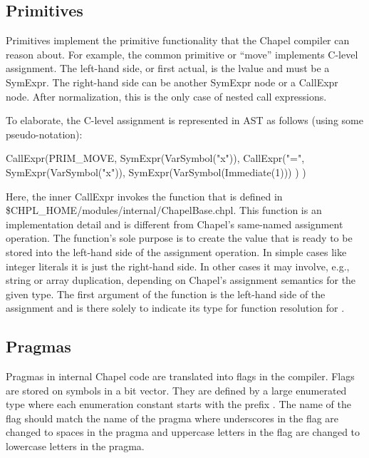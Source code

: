 \documentclass[10pt]{article}
\begin{document}
\subsection{Primitives}
\label{sec:primitives}
\label{sec:moveprimitive}

Primitives implement the primitive functionality that the Chapel
compiler can reason about.  For example, the common primitive
 or ``move'' implements C-level assignment.  The
left-hand side, or first actual, is the lvalue and must be a SymExpr.
The right-hand side can be another SymExpr node or a CallExpr node.
After normalization, this is the only case of nested call expressions.

To elaborate, the C-level assignment  is represented in AST
as follows (using some pseudo-notation):
\begin{clang}
CallExpr(PRIM_MOVE,
         SymExpr(VarSymbol("x")),
         CallExpr("=",
                  SymExpr(VarSymbol("x")),
                  SymExpr(VarSymbol(Immediate(1)))
                  )
         )
\end{clang}

Here, the inner CallExpr invokes the \chpl{=} function that is defined
in \$CHPL\_HOME/modules/internal/ChapelBase.chpl.  This function is an
implementation detail and is different from Chapel's same-named
assignment operation.  The \chpl{=} function's sole purpose is to
create the value that is ready to be stored into the left-hand side of
the assignment operation. In simple cases like integer literals it is
just the right-hand side. In other cases it may involve, e.g., string
or array duplication, depending on Chapel's assignment semantics for
the given type.  The first argument of the \chpl{=} function is the
left-hand side of the assignment and is there solely to indicate its
type for function resolution for \chpl{=}.

\subsection{Pragmas}
\label{sec:flags}
\label{sec:pragmas}

Pragmas in internal Chapel code are translated into flags in the
compiler.  Flags are stored on symbols in a bit vector.  They are
defined by a large enumerated type where each enumeration constant
starts with the prefix .  The name of the flag should match
the name of the pragma where underscores in the flag are changed to
spaces in the pragma and uppercase letters in the flag are changed to
lowercase letters in the pragma.
\end{document}
